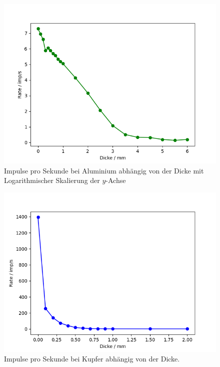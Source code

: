 \documentclass{article}
\begin{document}
\begin{figure}[H]
\centering
\includegraphics[scale=0.6]{Al_imp_log.png}
\caption{Impulse pro Sekunde bei Aluminium abhängig von der Dicke mit Logarithmischer Skalierung der $y$-Achse}
\label{fig:al_imp_log}
\end{figure}








\begin{figure}[H]
\centering
\includegraphics[scale=0.6]{Cu_imp.png}
\caption{Impulse pro Sekunde bei Kupfer abhängig von der Dicke. }
\label{fig:cu_imp}
\end{figure}
\end{document}
